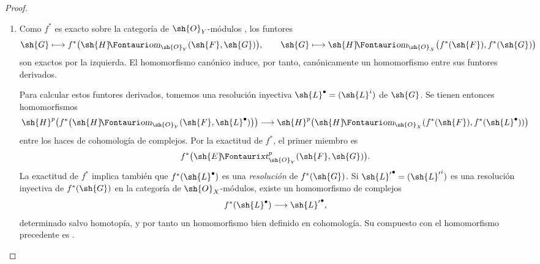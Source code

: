 \documentclass[oneside]{amsart}
\makeatletter
\newcommand*{\ega@sheafop}[3]{\sh{#1}#2\textup{\kern-2.2pt{\Fontauri\slshape #3}}}
\newcommand*{\shHom}{\ega@sheafop{H}{}{om}}
\newcommand*{\shExt}{\ega@sheafop{E}{}{xt}}
\makeatother
\begin{document}
\begin{proof}
\begin{enumerate}
  \item[\rm(i)]
  Como $f^*$ es exacto sobre la categoría de $\sh{O}_Y$-módulos
  , los funtores
  \[
    \sh{G}\longmapsto
      f^*\bigl(\shHom_{\sh{O}_Y}(\sh{F},\sh{G})\bigr),
    \qquad
    \sh{G}\longmapsto
      \shHom_{\sh{O}_X}\bigl(f^*(\sh{F}),f^*(\sh{G})\bigr)
  \]
  son exactos por la izquierda.  El homomorfismo canónico
   induce, por tanto, canónicamente un
  homomorfismo entre sus funtores derivados.

  Para calcular estos funtores derivados, tomemos una resolución inyectiva
  $\sh{L}^\bullet=(\sh{L}^i)$ de $\sh{G}$.  Se tienen entonces
  homomorfismos
  \[
    \begin{aligned}
    \sh{H}^p\!\left(
      f^*\bigl(\shHom_{\sh{O}_Y}
        (\sh{F},\sh{L}^\bullet)\bigr)\right)
    \longrightarrow
    \sh{H}^p\!\left(
      \shHom_{\sh{O}_X}
        (f^*(\sh{F}),f^*(\sh{L}^\bullet))\right)
    \end{aligned}
  \]
  entre los haces de cohomología de complejos.
  Por la exactitud de $f^*$, el primer miembro es
  \[
    f^*\bigl(\shExt^p_{\sh{O}_Y}(\sh{F},\sh{G})\bigr).
  \]
  La exactitud de $f^*$ implica también que
  $f^*(\sh{L}^\bullet)$ es una \emph{resolución} de $f^*(\sh{G})$.
  Si ${\sh{L}'}^\bullet=({\sh{L}'}^i)$ es una resolución inyectiva
  de $f^*(\sh{G})$ en la categoría de $\sh{O}_X$-módulos, existe un
  homomorfismo de complejos
  \[
    f^*(\sh{L}^\bullet)\longrightarrow{\sh{L}'}^\bullet,
  \]
  determinado salvo homotopía, y por tanto un homomorfismo bien definido en
  cohomología.  Su compuesto con el homomorfismo precedente es
  .


\end{enumerate}
\end{proof}
\end{document}
